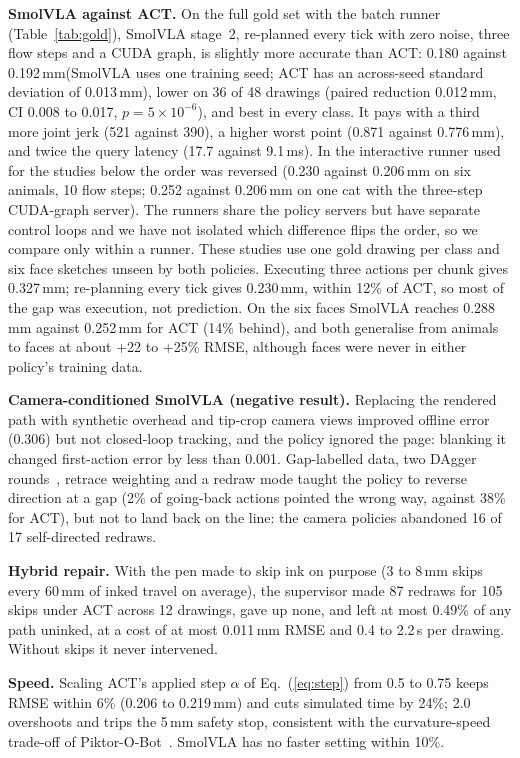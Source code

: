 \documentclass[conference]{IEEEtran}
\newcommand{\mm}{\,mm\xspace}
\begin{document}
\textbf{SmolVLA against ACT.} On the full gold set with the batch runner (Table~\ref{tab:gold}), SmolVLA
stage~2, re-planned every tick with zero noise, three flow steps and a CUDA graph, is slightly more accurate than
ACT: 0.180 against 0.192\mm (SmolVLA uses one training seed; ACT has an across-seed standard deviation of
0.013\mm), lower on 36 of 48 drawings (paired reduction 0.012\mm, CI 0.008 to 0.017, $p=5\times10^{-6}$), and best
in every class. It pays with a third more joint jerk (521 against 390), a higher worst point (0.871 against
0.776\mm), and twice the query latency (17.7 against 9.1\,ms). In the interactive runner used for the studies
below the order was reversed (0.230 against 0.206\mm on six animals, 10 flow steps; 0.252 against 0.206\mm on one
cat with the three-step CUDA-graph server). The runners share the policy servers but have separate control loops
and we have not isolated which difference flips the order, so we compare only within a runner. These studies use one gold
drawing per class and six face sketches unseen by both policies. Executing three actions per chunk gives
0.327\mm; re-planning every tick gives 0.230\mm, within 12\% of ACT, so most of the gap was execution, not
prediction. On the six faces SmolVLA reaches 0.288\mm against 0.252\mm for ACT (14\% behind), and both generalise from animals to faces at about +22 to
+25\% RMSE, although faces were never in either policy's training data.

\textbf{Camera-conditioned SmolVLA (negative result).} Replacing the rendered path with synthetic overhead and
tip-crop camera views improved offline error (0.306) but not closed-loop tracking, and the policy ignored the
page: blanking it changed first-action error by less than 0.001. Gap-labelled data, two DAgger
rounds~\cite{ross2011dagger}, retrace weighting and a redraw mode taught the policy to reverse direction at a gap
(2\% of going-back actions pointed the wrong way, against 38\% for ACT), but not to land back on the line: the
camera policies abandoned 16 of 17 self-directed redraws.

\textbf{Hybrid repair.} With the pen made to skip ink on purpose (3 to 8\mm skips every 60\mm of inked travel on
average), the supervisor made 87 redraws for 105 skips under ACT across 12 drawings, gave up none, and left at
most 0.49\% of any path uninked, at a cost of at most 0.011\mm RMSE and 0.4 to 2.2\,s per drawing. Without skips
it never intervened.

\textbf{Speed.} Scaling ACT's applied step $\alpha$ of Eq.~(\ref{eq:step}) from 0.5 to 0.75 keeps RMSE within 6\%
(0.206 to 0.219\mm) and cuts simulated time by 24\%; 2.0 overshoots and trips the 5\mm safety stop, consistent with the
curvature-speed trade-off of Piktor-O-Bot~\cite{csempesz2024piktor}. SmolVLA has no faster setting within 10\%.
\end{document}
